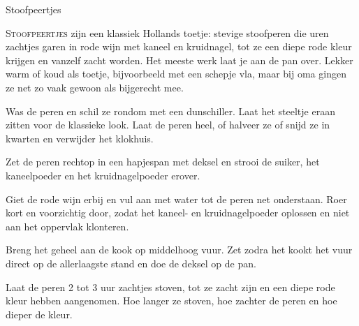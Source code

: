 \begin{recipe}{Stoofpeertjes}


\lettrine{S}{toofpeertjes} zijn een klassiek Hollands toetje: stevige stoofperen
die uren zachtjes garen in rode wijn met kaneel en kruidnagel, tot ze een
diepe rode kleur krijgen en vanzelf zacht worden. Het meeste werk laat je aan
de pan over. Lekker warm of koud als toetje, bijvoorbeeld met een schepje
vla, maar bij oma gingen ze net zo vaak gewoon als bijgerecht mee.

\begin{ingredients}
\end{ingredients}

\begin{steps}
  \item Was de peren en schil ze rondom met een dunschiller. Laat het
        steeltje eraan zitten voor de klassieke look. Laat de peren heel, of
        halveer ze of snijd ze in kwarten en verwijder het klokhuis.
  \item Zet de peren rechtop in een hapjespan met deksel en strooi de suiker,
        het kaneelpoeder en het kruidnagelpoeder erover.
  \item Giet de rode wijn erbij en vul aan met water tot de peren net
        onderstaan. Roer kort en voorzichtig door, zodat het kaneel- en
        kruidnagelpoeder oplossen en niet aan het oppervlak klonteren.
  \item Breng het geheel aan de kook op middelhoog vuur. Zet zodra het kookt
        het vuur direct op de allerlaagste stand en doe de deksel op de pan.
  \item Laat de peren 2 tot 3 uur zachtjes stoven, tot ze zacht zijn en een
        diepe rode kleur hebben aangenomen. Hoe langer ze stoven, hoe zachter
        de peren en hoe dieper de kleur.
\end{steps}
\end{recipe}
